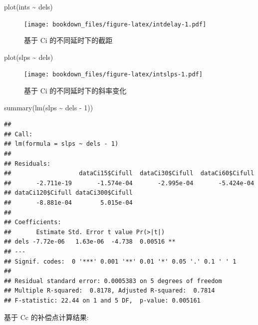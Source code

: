 \documentclass[
]{krantz}
\makeatletter
\newenvironment{Shaded}{\begin{snugshade}}{\end{snugshade}}
\newcommand{\DecValTok}[1]{\textcolor[rgb]{0.00,0.00,0.81}{#1}}
\newcommand{\FunctionTok}[1]{\textcolor[rgb]{0.00,0.00,0.00}{#1}}
\newcommand{\NormalTok}[1]{#1}
\newcommand{\SpecialCharTok}[1]{\textcolor[rgb]{0.00,0.00,0.00}{#1}}
\newenvironment{kframe}{%
\medskip{}
\setlength{\fboxsep}{.8em}
 \def\at@end@of@kframe{}%
 \ifinner\ifhmode%
  \def\at@end@of@kframe{\end{minipage}}%
  \begin{minipage}{\columnwidth}%
 \fi\fi%
 \def\FrameCommand##1{\hskip\@totalleftmargin \hskip-\fboxsep
 \colorbox{shadecolor}{##1}\hskip-\fboxsep
     \hskip-\linewidth \hskip-\@totalleftmargin \hskip\columnwidth}%
 \MakeFramed {\advance\hsize-\width
   \@totalleftmargin\z@ \linewidth\hsize
   \@setminipage}}%
 {\par\unskip\endMakeFramed%
 \at@end@of@kframe}
\renewenvironment{Shaded}{\begin{kframe}}{\end{kframe}}
\makeatother
\begin{document}
\begin{Shaded}
\begin{Highlighting}[]
\FunctionTok{plot}\NormalTok{(ints }\SpecialCharTok{\textasciitilde{}}\NormalTok{ dels)}
\end{Highlighting}
\end{Shaded}

\begin{figure}
\centering
\texttt{[image: bookdown\_files/figure-latex/intdelay-1.pdf]}
\caption{\label{fig:intdelay}基于 Ci 的不同延时下的截距}
\end{figure}

\begin{Shaded}
\begin{Highlighting}[]
\FunctionTok{plot}\NormalTok{(slps }\SpecialCharTok{\textasciitilde{}}\NormalTok{ dels)}
\end{Highlighting}
\end{Shaded}

\begin{figure}
\centering
\texttt{[image: bookdown\_files/figure-latex/intslps-1.pdf]}
\caption{\label{fig:intslps}基于 Ci 的不同延时下的斜率变化}
\end{figure}

\begin{Shaded}
\begin{Highlighting}[]
\FunctionTok{summary}\NormalTok{(}\FunctionTok{lm}\NormalTok{(slps }\SpecialCharTok{\textasciitilde{}}\NormalTok{ dels }\SpecialCharTok{{-}} \DecValTok{1}\NormalTok{))}
\end{Highlighting}
\end{Shaded}

\begin{verbatim}
## 
## Call:
## lm(formula = slps ~ dels - 1)
## 
## Residuals:
##                   dataCi15$Cifull  dataCi30$Cifull  dataCi60$Cifull 
##       -2.711e-19       -1.574e-04       -2.995e-04       -5.424e-04 
## dataCi120$Cifull dataCi300$Cifull 
##       -8.881e-04        5.015e-04 
## 
## Coefficients:
##       Estimate Std. Error t value Pr(>|t|)   
## dels -7.72e-06   1.63e-06  -4.738  0.00516 **
## ---
## Signif. codes:  0 '***' 0.001 '**' 0.01 '*' 0.05 '.' 0.1 ' ' 1
## 
## Residual standard error: 0.0005383 on 5 degrees of freedom
## Multiple R-squared:  0.8178, Adjusted R-squared:  0.7814 
## F-statistic: 22.44 on 1 and 5 DF,  p-value: 0.005161
\end{verbatim}

基于 Cc 的补偿点计算结果:
\end{document}
